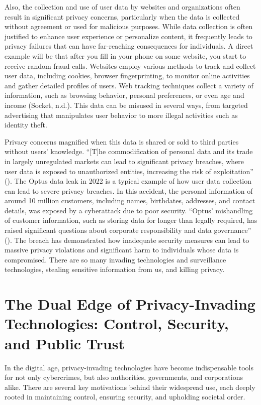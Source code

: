 \documentclass[a4paper,12pt]{article}
\newcommand{\sectionpage}[1]{
  \newpage
  \section{#1}
  \doublespacing
  \singlespacing
}
\begin{document}
Also, the collection and use of user data by websites and organizations often result in significant privacy concerns, particularly when the data is collected without agreement or used for malicious purposes. While data collection is often justified to enhance user experience or personalize content, it frequently leads to privacy failures that can have far-reaching consequences for individuals. A direct example will be that after you fill in your phone on some website, you start to receive random fraud calls. Websites employ various methods to track and collect user data, including cookies, browser fingerprinting, to monitor online activities and gather detailed profiles of users. Web tracking techniques collect a variety of information, such as browsing behavior, personal preferences, or even age and income (Socket, n.d.). This data can be misused in several ways, from targeted advertising that manipulates user behavior to more illegal activities such as identity theft.

Privacy concerns magnified when this data is shared or sold to third parties without users’ knowledge. “[T]he commodification of personal data and its trade in largely unregulated markets can lead to significant privacy breaches, where user data is exposed to unauthorized entities, increasing the risk of exploitation” (\cite{jiang2024privacy}). The Optus data leak in 2022 is a typical example of how user data collection can lead to severe privacy breaches. In this accident, the personal information of around 10 million customers, including names, birthdates, addresses, and contact details, was exposed by a cyberattack due to poor security. “Optus’ mishandling of customer information, such as storing data for longer than legally required, has raised significant questions about corporate responsibility and data governance” (\cite{cmaaustralia2022optus}). The breach has demonstrated how inadequate security measures can lead to massive privacy violations and significant harm to individuals whose data is compromised. There are so many invading technologies and surveillance technologies, stealing sensitive information from us, and killing privacy. 



\sectionpage{The Dual Edge of Privacy-Invading Technologies: Control, Security, and Public Trust}
\onehalfspacing
In the digital age, privacy-invading technologies have become indispensable tools for not only cybercrimes, but also authorities, governments, and corporations alike. There are several key motivations behind their widespread use, each deeply rooted in maintaining control, ensuring security, and upholding societal order.
\end{document}
